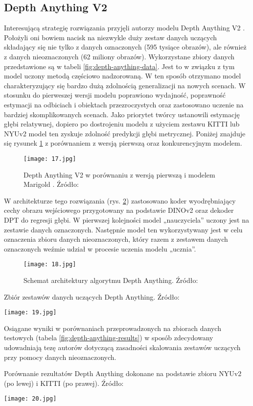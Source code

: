 \subsection{Depth Anything V2}
Interesującą strategię rozwiązania przyjęli autorzy modelu Depth Anything V2 \cite{yang2024depth}. Położyli oni bowiem nacisk na niezwykle duży zestaw danych uczących składający się nie tylko z danych oznaczonych (595 tysiące obrazów), ale również z danych nieoznaczonych (62 miliony obrazów). Wykorzystane zbiory danych przedstawione są w tabeli \ref{fig:depth-anything-data}. Jest to w związku z tym model uczony metodą częściowo nadzorowaną. W ten sposób otrzymano model charakteryzujący się bardzo dużą zdolnością generalizacji na nowych scenach. W stosunku do pierweszej wersji modelu \cite{yang2024depthv1} poprawiono wydajność, poprawność estymacji na odbiciach i obiektach przezroczystych oraz zastosowano uczenie na bardziej skomplikowanych scenach. Jako priorytet twórcy ustanowili estymację głębi relatywnej, dopiero po dostrojeniu modelu z użyciem zestawu KITTI lub NYUv2 model ten zyskuje zdolność predykcji głębi metrycznej. Poniżej znajduje się rysunek \ref{fig:depth-anything} z porównaniem z wersją pierwszą oraz konkurencyjnym modelem.
\begin{figure}[H]
    \centering
    \texttt{[image: 17.jpg]}
    \caption{Depth Anything V2 w porównaniu z wersją pierwszą i modelem Marigold \cite{ke2024repurposing}. Źródło: \cite{yang2024depth}}
    \label{fig:depth-anything}
\end{figure}
W architekturze tego rozwiązania (rys. \ref{fig:depth-anything-schema}) zastosowano koder wyodrębniający cechy obrazu wejściowego przygotowany na podstawie DINOv2 \cite{oquab2024} oraz dekoder DPT do regresji głębi. W pierwszej kolejności model „nauczyciela” uczony jest na zestawie danych oznaczonych. Następnie model ten wykorzystywany jest w celu oznaczenia zbioru danych nieoznaczonych, który razem z zestawem danych oznaczonych weźmie udział w procesie uczenia modelu „ucznia”.
\begin{figure}[H]
    \centering
    \texttt{[image: 18.jpg]}
    \caption{Schemat architektury algorytmu Depth Anything. Źródło: \cite{yang2024depth}}
    \label{fig:depth-anything-schema}
\end{figure}
\begin{table}[H]
    \centering
    \caption{Zbiór zestawów danych uczących Depth Anything. Źródło: \cite{yang2024depth}}
    \texttt{[image: 19.jpg]}
    \label{fig:depth-anything-data}
\end{table}
Osiągane wyniki w porównaniach przeprowadzonych na zbiorach danych testowych (tabela \ref{fig:depth-anything-results}) w sposób zdecydowany udowadniają tezę autorów dotyczącą zasadności skalowania zestawów uczących przy pomocy danych nieoznaczonych.
\begin{table}[H]
    \centering
    \caption{Porównanie rezultatów Depth Anything dokonane na podstawie zbioru NYUv2 (po lewej) i KITTI (po prawej). Źródło: \cite{yang2024depth}}
    \texttt{[image: 20.jpg]}
    \label{fig:depth-anything-results}
\end{table}

